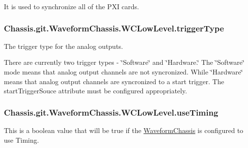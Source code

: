 It is used to synchronize all of the P\-X\-I cards. \hypertarget{class_chassis_8git_1_1_waveform_chassis_1_1_w_c_low_level_aa54d2b2708f1f4e3793e3ca4918c8859}{
\subsubsection[{trigger\-Type}]{\setlength{\rightskip}{0pt plus 5cm}Chassis.\-git.\-Waveform\-Chassis.\-W\-C\-Low\-Level.\-trigger\-Type}}\label{class_chassis_8git_1_1_waveform_chassis_1_1_w_c_low_level_aa54d2b2708f1f4e3793e3ca4918c8859}


The trigger type for the analog outputs. 

There are currently two trigger types -\/ \char`\"{}\-Software\char`\"{} and \char`\"{}\-Hardware.\char`\"{} The \char`\"{}\-Software\char`\"{} mode means that analog output channels are not syncronized. While \char`\"{}\-Hardware\char`\"{} means that analog output channels are syncronized to a start trigger. The start\-Trigger\-Souce attribute must be configured appropriately. \hypertarget{class_chassis_8git_1_1_waveform_chassis_1_1_w_c_low_level_adaf5c01accf94bdd2863537359418a0a}{
\subsubsection[{use\-Timing}]{\setlength{\rightskip}{0pt plus 5cm}Chassis.\-git.\-Waveform\-Chassis.\-W\-C\-Low\-Level.\-use\-Timing}}\label{class_chassis_8git_1_1_waveform_chassis_1_1_w_c_low_level_adaf5c01accf94bdd2863537359418a0a}


This is a boolean value that will be true if the \hyperlink{class_chassis_8git_1_1_waveform_chassis_1_1_waveform_chassis}{Waveform\-Chassis} is configured to use Timing. 



